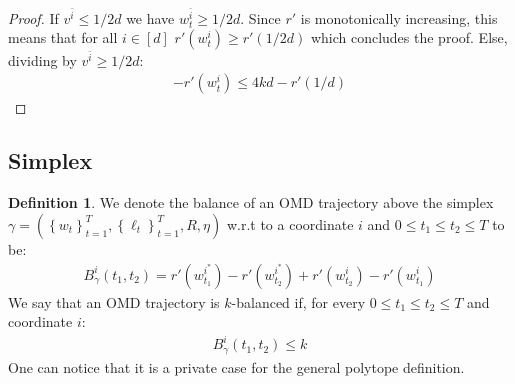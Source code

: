 \documentclass[10pt]{article}
\theoremstyle{definition}
\newtheorem{definition}[theorem]{Definition}
\theoremstyle{remark}
\newcommand{\curly}[1]{ {\left\{ #1 \right\}}}
\begin{document}
\begin{proof}
If $v^{\bar{i}} \le 1/2d$ we have $w_t^{\bar{i}} \ge 1/2d$. Since $r'$ is monotonically increasing, this means that for all $i\in[d]$ $r'(w_t^i) \ge r'(1/2d)$ which concludes the proof. Else, dividing by $v^{\bar{i}} \ge 1/2d$:
\begin{align*}
    -r'(w_t^i) \le 4kd - r'(1/d)
\end{align*}
\end{proof}

\subsection{Simplex}
\begin{definition}\label{def:balance_simplex}
We denote the balance of an OMD trajectory above the simplex $\gamma=(\curly{w_t}_{t=1}^T, \curly{\ell_t}_{t=1}^T, R, \eta)$ w.r.t to a coordinate $i$ and $0\le t_1\le t_2 \le T$ to be:
\begin{align*}
    B_\gamma^i(t_1,t_2) = r'(w_{t_1}^{i^*}) - r'(w_{t_2}^{i^*}) + r'(w_{t_2}^i) - r'(w_{t_1}^i)
\end{align*}
We say that an OMD trajectory is $k$-balanced if, for every $0\le t_1\le t_2 \le T$ and coordinate $i$:
\begin{align*}
    B_\gamma^i(t_1,t_2) \le k
\end{align*}
One can notice that it is a private case for the general polytope definition.
\end{definition}
\end{document}
